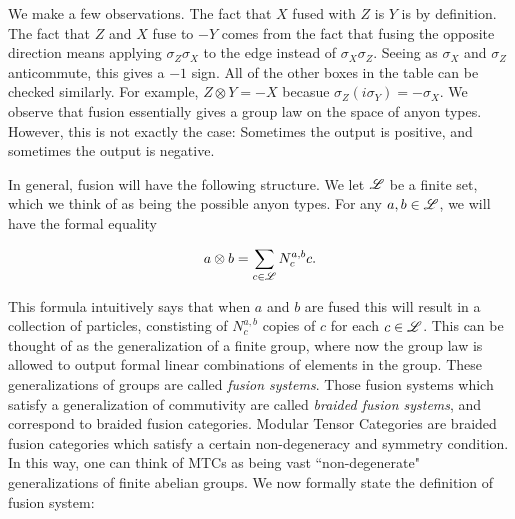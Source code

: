 \documentclass{article}
\theoremstyle{definition}
\numberwithin{figure}{section}
\begin{document}
We make a few observations. The fact that $X$ fused with $Z$ is $Y$ is by definition. The fact that $Z$ and $X$ fuse to $-Y$ comes from the fact that fusing the opposite direction means applying $\sigma_Z\sigma_X$ to the edge instead of $\sigma_X\sigma_Z$. Seeing as $\sigma_X$ and $\sigma_Z$ anticommute, this gives a $-1$ sign. All of the other boxes in the table can be checked similarly. For example, $Z\otimes Y=-X$ becasue $\sigma_Z(i\sigma_Y)=-\sigma_X$. We observe that fusion essentially gives a group law on the space of anyon types. However, this is not exactly the case: Sometimes the output is positive, and sometimes the output is negative.

In general, fusion will have the following structure. We let $\mathscr{L}$ be a finite set, which we think of as being the possible anyon types. For any $a,b\in \mathscr{L}$, we will have the formal equality

$$a\otimes b=\sum_{c\in \mathscr{L}}N_{c}^{a,b}c.$$

This formula intuitively says that when $a$ and $b$ are fused this will result in a collection of particles, constisting of $N_c^{a,b}$ copies of $c$ for each $c\in \mathscr{L}$. This can be thought of as the generalization of a finite group, where now the group law is allowed to output formal linear combinations of elements in the group. These generalizations of groups are called \textit{fusion systems}. Those fusion systems which satisfy a generalization of commutivity are called \textit{braided fusion systems}, and correspond to braided fusion categories. Modular Tensor Categories are braided fusion categories which satisfy a certain non-degeneracy and symmetry condition. In this way, one can think of MTCs as being vast ``non-degenerate" generalizations of finite abelian groups. We now formally state the definition of fusion system:
\end{document}

